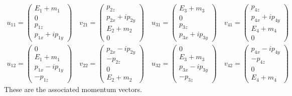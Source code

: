 \documentclass[12pt]{article}
\begin{document}
\begin{gather*}
u_{11}=\begin{pmatrix}E_1+m_1\\0\\p_{1z}\\p_{1x}+ip_{1y}\end{pmatrix}\quad
v_{21}=\begin{pmatrix}p_{2z}\\p_{2x}+ip_{2y}\\E_2+m_2\\0\end{pmatrix}\quad
u_{31}=\begin{pmatrix}E_3+m_3\\0\\p_{3z}\\p_{3x}+ip_{3y}\end{pmatrix}\quad
v_{41}=\begin{pmatrix}p_{4z}\\p_{4x}+ip_{4y}\\E_4+m_4\\0\end{pmatrix}\\
u_{12}=\begin{pmatrix}0\\E_1+m_1\\p_{1x}-ip_{1y}\\-p_{1z}\end{pmatrix}\quad
v_{22}=\begin{pmatrix}p_{2x}-ip_{2y}\\-p_{2z}\\0\\E_2+m_2\end{pmatrix}\quad
u_{32}=\begin{pmatrix}0\\E_3+m_3\\p_{3x}-ip_{3y}\\-p_{3z}\end{pmatrix}\quad
v_{42}=\begin{pmatrix}p_{4x}-ip_{4y}\\-p_{4z}\\0\\E_4+m_4\end{pmatrix}
\end{gather*}
%
These are the associated momentum vectors.
\end{document}
